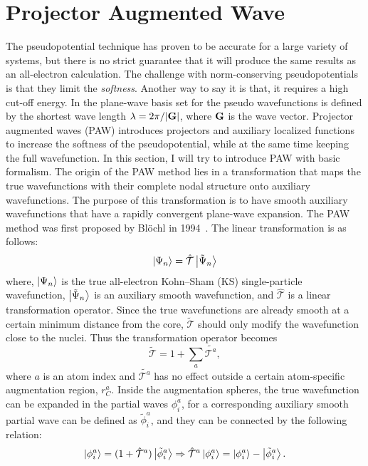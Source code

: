 \chapter{Projector Augmented Wave}\label{appen_paw}

The pseudopotential technique has proven to be accurate for a large variety of systems, but there is no strict guarantee that it will produce the same results as an all-electron calculation. The challenge with norm-conserving pseudopotentials is that they limit the \textit{softness}. Another way to say it is that, it requires a high cut-off energy. In the plane-wave basis set for the pseudo wavefunctions is defined by the shortest wave length $\lambda=2\pi/\abs{\vb{G}}$, where $\vb{G}$ is the wave vector. Projector augmented waves (PAW) introduces projectors and auxiliary localized functions to increase the softness of the pseudopotential, while at the same time keeping the full wavefunction. In this section, I will try to introduce PAW with basic formalism. The origin of the PAW method lies in a transformation that maps the true wavefunctions with their complete nodal structure onto auxiliary wavefunctions. The purpose of this transformation is to have smooth auxiliary wavefunctions that have a rapidly convergent plane-wave expansion. The PAW method was first proposed by Bl\"ochl in 1994~\cite{blochl1994projector}. The linear transformation is as follows:
\begin{equation}
\ket{\Psi_n} = \hat{\mathcal{T}}\ket{\tilde{\Psi}_n}
\end{equation}
where, $\ket{\Psi_n}$ is the true all-electron Kohn--Sham (KS) single-particle wavefunction, $\ket{\tilde{\Psi}_n}$ is an auxiliary smooth wavefunction, and $\hat{\mathcal{T}}$ is a linear transformation operator. Since the true wavefunctions are already smooth at a certain minimum distance from the core, $\tilde{\mathcal{T}}$ should only modify the wavefunction close to the nuclei. Thus the transformation operator becomes
\begin{equation}
\tilde{\mathcal{T}} = 1 + \sum_a \tilde{\mathcal{T}^a},
\end{equation}
where $a$ is an atom index and $\tilde{\mathcal{T}^a}$ has no effect outside a certain atom-specific augmentation region, $r_C^a$. Inside the augmentation spheres, the true wavefunction can be expanded in the partial waves $\phi_i^a$, for a corresponding auxiliary smooth partial wave can be defined as $\tilde{\phi}_i^a$, and they can be connected by the following relation:
\begin{equation}
\label{eq_aug_t}
\ket{\phi_i^a} = (1+\hat{\mathcal{T}}^a)\ket{\tilde{\phi}_i^a} \Rightarrow  \hat{\mathcal{T}}^a \ket{\phi_i^a} = \ket{\phi_i^a} - \ket{\tilde{\phi}_i^a}.
\end{equation} 
